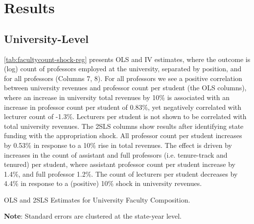 \section{Results}
\label{sec:results}

\subsection{University-Level}

\autoref{tab:facultycount-shock-reg} presents OLS and IV estimates, where the outcome is (log) count of professors employed at the university, separated by position, and for all professors (Columns 7, 8).
For all professors we see a positive correlation between university revenues and professor count per student (the OLS columns), where an increase in university total revenues by 10\% is associated with an increase in professor count per student of 0.83\%, yet negatively correlated with lecturer count of -1.3\%.
Lecturers per student is not shown to be correlated with total university revenues.
The 2SLS columns show results after identifying state funding with the appropriation shock.
All professor count per student increases by 0.53\% in response to a 10\% rise in total revenues.
The effect is driven by increases in the count of assistant and full professors (i.e. tenure-track and tenured) per student, where assistant professor count per student increase by 1.4\%, and full professor 1.2\%.
The count of lecturers per student decreases by 4.4\% in response to a (positive) 10\% shock in university revenues.

\begin{table}[h!]
    \singlespacing
    \centering
    \caption{OLS and 2SLS Estimates for University Faculty Composition.}
    \makebox[\textwidth][c]{}
    \begin{flushleft}
        \footnotesize
        \textbf{Note}: Standard errors are clustered at the state-year level.
    \end{flushleft}
    \label{tab:facultycount-shock-reg}
\end{table}

